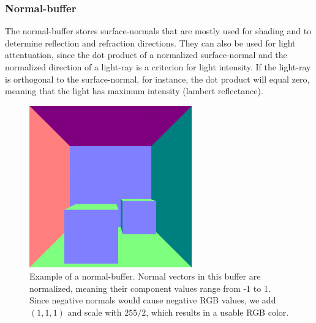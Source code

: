 \documentclass{ACGSeminar}
\begin{document}
		\subsubsection{Normal-buffer}
			The normal-buffer stores surface-normals that are mostly used for shading and to determine reflection and refraction directions. They can also be used for light attentuation, since the dot product of a normalized surface-normal and the normalized direction of a light-ray is a criterion for light intensity. If the light-ray is orthogonal to the surface-normal, for instance, the dot product will equal zero, meaning that the light has maximum intensity (lambert reflectance).
			\begin{figure}[htb!]%
				\begin{center}%
					\includegraphics[width=7cm]{img/normal_buffer.png}
				\end{center}%
				\caption{Example of a normal-buffer. Normal vectors in this buffer are normalized, meaning their component values range from -1 to 1. Since negative normals would cause negative RGB values, we add $(1, 1, 1)$ and scale with $255/2$, which results in a usable RGB color.}%
				\label{fig:normal_buffer}
			\end{figure}%
\end{document}

